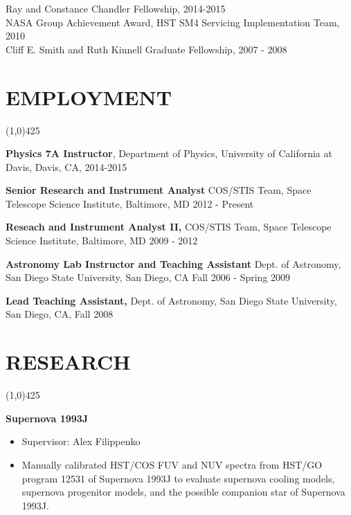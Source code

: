 \documentclass{res}
\begin{document}
\begin{resume}
Ray and Constance Chandler Fellowship, 2014-2015 \\
NASA Group Achievement Award, HST SM4 Servicing Implementation Team, 2010 \\
Cliff E. Smith and Ruth Kinnell Graduate Fellowship, 2007 - 2008 \\
 
\section{EMPLOYMENT}
\vspace{-.2in} 
\begin{center}
\line(1,0){425}
\end{center}
\vspace{-.3in} 
\vspace{0.1in} 
    {\bf Physics 7A Instructor}, Department of Physics, University of California at Davis, Davis, CA, 2014-2015

    {\bf Senior Research and Instrument Analyst} COS/STIS Team, Space Telescope Science Institute, Baltimore, MD
    2012 - Present

    {\bf Reseach and Instrument Analyst II,} COS/STIS Team, Space Telescope Science Institute, Baltimore, MD 
    2009 - 2012 
 
    {\bf Astronomy Lab Instructor and Teaching Assistant} Dept. of Astronomy, San Diego State University, San Diego, CA  Fall 2006 - Spring 2009 
 
    {\bf Lead Teaching Assistant,} Dept. of Astronomy, San Diego State University, San Diego, CA, Fall 2008
    
\newpage

\section{RESEARCH} 
\vspace{-.2in}
\begin{center}
\line(1,0){425}
\end{center}
\vspace{-.3in}
\vspace{0.1in}

   {\bf  Supernova 1993J}
          \begin{itemize}
   	\item[] Supervisor: Alex Filippenko
        \item[] Manually calibrated HST/COS FUV and NUV spectra from HST/GO program 12531 of Supernova 1993J to evaluate supernova cooling models, 
        supernova progenitor models, and the possible companion star of Supernova 1993J. 
        \end{itemize} 
 

\end{resume}
\end{document}
